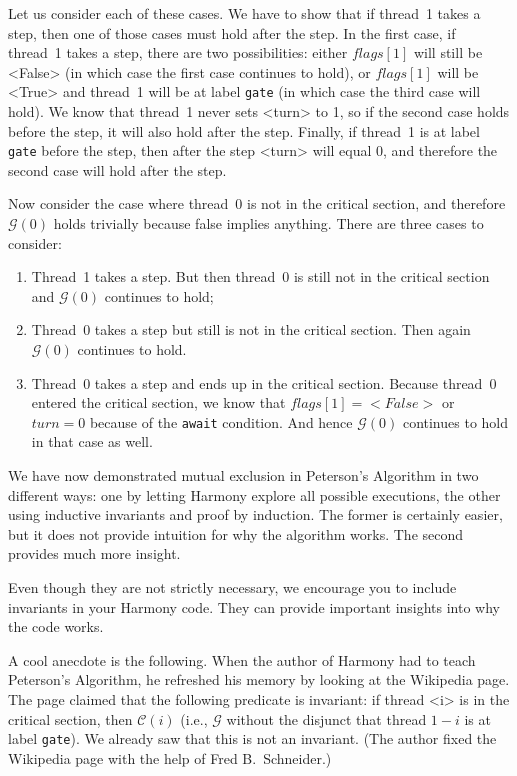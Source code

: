 \documentclass{report}
\begin{document}
Let us consider each of these cases.
We have to show that if thread~1 takes a step, then one of those
cases must hold after the step.
In the first case, if thread~1 takes a step, there are two possibilities:
either $flags[1]$ will still be <{False}> (in which case the first case
continues to hold), or $flags[1]$ will be <{True}>
and thread~1 will be at label \texttt{gate} (in which case the third case
will hold).
We know that thread~1 never sets <{turn}> to 1, so
if the second case holds before the step, it will also hold after the step.
Finally, if thread~1 is at label \texttt{gate} before the step, then after
the step <{turn}> will equal 0, and therefore the second case will hold
after the step.

Now consider the case where thread~0 is not in the critical section,
and therefore $\mathcal{G}(0)$ holds trivially because false implies
anything.
There are three cases to consider:
\begin{enumerate}
\item Thread~1 takes a step.  But then thread~0 is still not in the critical
section and $\mathcal{G}(0)$ continues to hold;
\item Thread~0 takes a step but still is not in the critical section.
Then again $\mathcal{G}(0)$ continues to hold.
\item Thread~0 takes a step and ends up in the critical section.
Because thread~0 entered the critical section, we know that
$\mathit{flags}[1] = <{False}>$ or $\mathit{turn} = 0$ because
of the \texttt{await} condition.
And hence $\mathcal{G}(0)$ continues to hold in that case as well.
\end{enumerate}

We have now demonstrated mutual exclusion in Peterson's Algorithm in two
different ways: one by letting Harmony explore all possible executions, the
other using inductive invariants and proof by induction.  The former
is certainly easier, but it does not provide intuition for why the
algorithm works.  The second provides much more insight.

Even though they are not strictly necessary, we encourage you
to include invariants in your Harmony code.
They can provide important insights into why the code works.

A cool anecdote is the following.  When the author of Harmony had to teach
Peterson's Algorithm, he refreshed his memory by looking at the Wikipedia
page.  The page claimed that the following predicate is invariant:
if thread <{i}> is in the critical section, then $\mathcal{C}(i)$ (i.e.,
$\mathcal{G}$ without the disjunct that thread $1-i$ is at label \texttt{gate}).
We already saw that this is not an invariant.
(The author fixed the Wikipedia page with the help of Fred B.~Schneider.)
\end{document}
